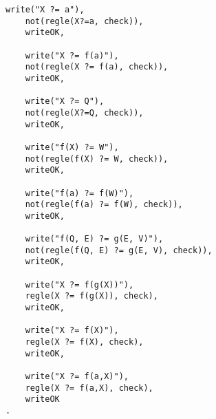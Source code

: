 \documentclass[10pt,a4paper]{report}
\begin{document}
\begin{lstlisting}[caption ={le fichier test.pl}]
	write("X ?= a"),
	not(regle(X?=a, check)),
	writeOK,

	write("X ?= f(a)"),
	not(regle(X ?= f(a), check)),
	writeOK,

	write("X ?= Q"),
	not(regle(X?=Q, check)),
	writeOK,

	write("f(X) ?= W"),
	not(regle(f(X) ?= W, check)),
	writeOK,

	write("f(a) ?= f(W)"),
	not(regle(f(a) ?= f(W), check)),
	writeOK,

	write("f(Q, E) ?= g(E, V)"),
	not(regle(f(Q, E) ?= g(E, V), check)),
	writeOK,

	write("X ?= f(g(X))"),
	regle(X ?= f(g(X)), check),
	writeOK,

	write("X ?= f(X)"),
	regle(X ?= f(X), check),
	writeOK,

	write("X ?= f(a,X)"),
	regle(X ?= f(a,X), check),
	writeOK
.
\end{lstlisting}
\end{document}

